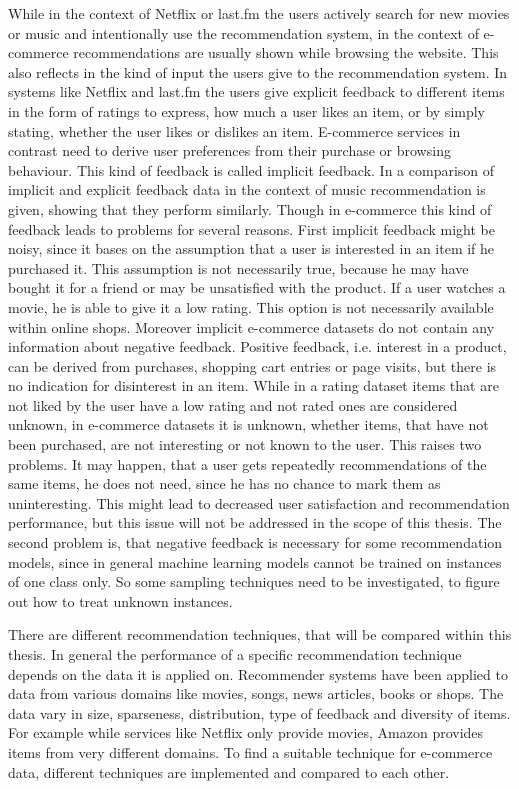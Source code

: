 \documentclass[10pt]{reportMaster}
\begin{document}
While in the context of Netflix or last.fm the users actively search for new movies or music and intentionally use the recommendation system, in the context of e-commerce recommendations are usually shown while browsing the website.
This also reflects in the kind of input the users give to the recommendation system.
In systems like Netflix  \cite{netflixPrize} and last.fm \cite{implExplComparisonLastfm} the users give explicit feedback to different items in the form of ratings to express, how much a user likes an item, or by simply stating, whether the user likes or dislikes an item.
E-commerce services in contrast need to derive user preferences from their purchase or browsing behaviour.
This kind of feedback is called implicit feedback.
In \cite{implExplComparisonLastfm} a comparison of implicit and explicit feedback data in the context of music recommendation is given, showing that they perform similarly.
Though in e-commerce this kind of feedback leads to problems for several reasons.
First implicit feedback might be noisy, since it bases on the assumption that a user is interested in an item if he purchased it.
This assumption is not necessarily true, because he may have bought it for a friend or may be unsatisfied with the product.
If a user watches a movie, he is able to give it a low rating.
This option is not necessarily available within online shops.
Moreover implicit e-commerce datasets do not contain any information about negative feedback.
Positive feedback, i.e. interest in a product, can be derived from purchases, shopping cart entries or page visits, but there is no indication for disinterest in an item.
While in a rating dataset items that are not liked by the user have a low rating and not rated ones are considered unknown, in e-commerce datasets it is unknown, whether items, that have not been purchased, are not interesting or not known to the user.
This raises two problems.
It may happen, that a user gets repeatedly recommendations of the same items, he does not need, since he has no chance to mark them as uninteresting.
This might lead to decreased user satisfaction and recommendation performance, but this issue will not be addressed in the scope of this thesis.
The second problem is, that negative feedback is necessary for some recommendation models, since in general machine learning models cannot be trained on instances of one class only.
So some sampling techniques need to be investigated, to figure out how to treat unknown instances.

There are different recommendation techniques, that will be compared within this thesis.
In general the performance of a specific recommendation technique depends on the data it is applied on.
Recommender systems have been applied to data from various domains like movies, songs, news articles, books or shops.
The data vary in size, sparseness, distribution, type of feedback and diversity of items.
For example while services like Netflix only provide movies, Amazon provides items from very different domains.
To find a suitable technique for e-commerce data, different techniques are implemented and compared to each other.
\end{document}
